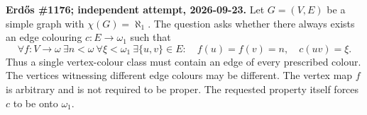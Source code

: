 \textbf{Erd\H{o}s \#1176; independent attempt, 2026-09-23.}
Let $G=(V,E)$ be a simple graph with $\chi(G)=\aleph_1$. The question asks whether there always exists an edge colouring $c:E\to\omega_1$ such that
\[
\forall f:V\to\omega\ \exists n<\omega\ \forall\xi<\omega_1\
\exists\{u,v\}\in E:\quad f(u)=f(v)=n,\quad c(uv)=\xi.
\]
Thus a single vertex-colour class must contain an edge of every prescribed colour. The vertices witnessing different edge colours may be different. The vertex map $f$ is arbitrary and is not required to be proper. The requested property itself forces $c$ to be onto $\omega_1$.
